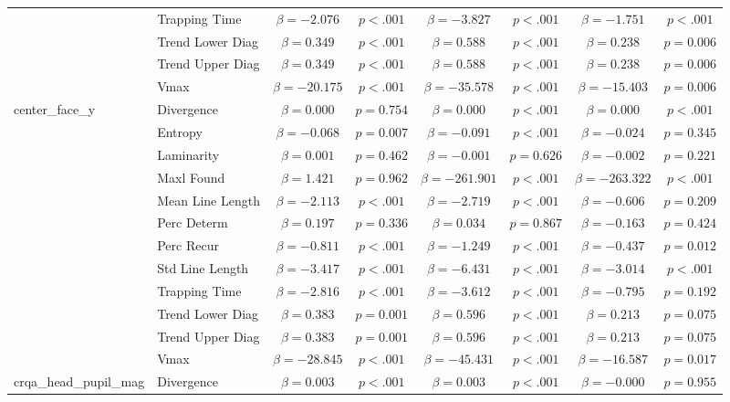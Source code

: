 \begin{tabular}{llcc|cc|cc}
 & Trapping Time & $\beta = -2.076$ & $p < .001$ & $\beta = -3.827$ & $p < .001$ & $\beta = -1.751$ & $p < .001$ \\
 & Trend Lower Diag & $\beta = 0.349$ & $p < .001$ & $\beta = 0.588$ & $p < .001$ & $\beta = 0.238$ & $p = 0.006$ \\
 & Trend Upper Diag & $\beta = 0.349$ & $p < .001$ & $\beta = 0.588$ & $p < .001$ & $\beta = 0.238$ & $p = 0.006$ \\
 & Vmax & $\beta = -20.175$ & $p < .001$ & $\beta = -35.578$ & $p < .001$ & $\beta = -15.403$ & $p = 0.006$ \\
\midrule
\multirow{12}{*}{center_face_y} & Divergence & $\beta = 0.000$ & $p = 0.754$ & $\beta = 0.000$ & $p < .001$ & $\beta = 0.000$ & $p < .001$ \\
 & Entropy & $\beta = -0.068$ & $p = 0.007$ & $\beta = -0.091$ & $p < .001$ & $\beta = -0.024$ & $p = 0.345$ \\
 & Laminarity & $\beta = 0.001$ & $p = 0.462$ & $\beta = -0.001$ & $p = 0.626$ & $\beta = -0.002$ & $p = 0.221$ \\
 & Maxl Found & $\beta = 1.421$ & $p = 0.962$ & $\beta = -261.901$ & $p < .001$ & $\beta = -263.322$ & $p < .001$ \\
 & Mean Line Length & $\beta = -2.113$ & $p < .001$ & $\beta = -2.719$ & $p < .001$ & $\beta = -0.606$ & $p = 0.209$ \\
 & Perc Determ & $\beta = 0.197$ & $p = 0.336$ & $\beta = 0.034$ & $p = 0.867$ & $\beta = -0.163$ & $p = 0.424$ \\
 & Perc Recur & $\beta = -0.811$ & $p < .001$ & $\beta = -1.249$ & $p < .001$ & $\beta = -0.437$ & $p = 0.012$ \\
 & Std Line Length & $\beta = -3.417$ & $p < .001$ & $\beta = -6.431$ & $p < .001$ & $\beta = -3.014$ & $p < .001$ \\
 & Trapping Time & $\beta = -2.816$ & $p < .001$ & $\beta = -3.612$ & $p < .001$ & $\beta = -0.795$ & $p = 0.192$ \\
 & Trend Lower Diag & $\beta = 0.383$ & $p = 0.001$ & $\beta = 0.596$ & $p < .001$ & $\beta = 0.213$ & $p = 0.075$ \\
 & Trend Upper Diag & $\beta = 0.383$ & $p = 0.001$ & $\beta = 0.596$ & $p < .001$ & $\beta = 0.213$ & $p = 0.075$ \\
 & Vmax & $\beta = -28.845$ & $p < .001$ & $\beta = -45.431$ & $p < .001$ & $\beta = -16.587$ & $p = 0.017$ \\
\midrule
\multirow{12}{*}{crqa_head_pupil_mag} & Divergence & $\beta = 0.003$ & $p < .001$ & $\beta = 0.003$ & $p < .001$ & $\beta = -0.000$ & $p = 0.955$ \\

\end{tabular}
